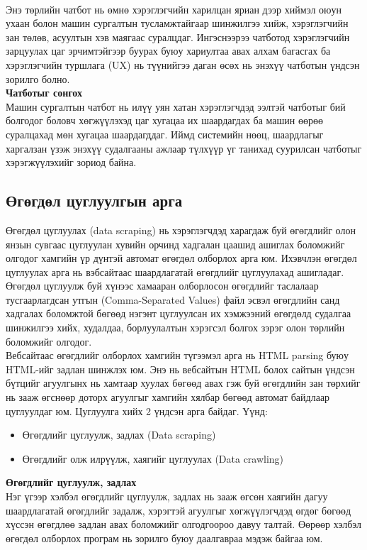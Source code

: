 \\Энэ төрлийн чатбот нь өмнө хэрэглэгчийн харилцан яриан дээр хиймэл оюун ухаан болон машин сургалтын тусламжтайгаар шинжилгээ хийж, хэрэглэгчийн зан төлөв, асуултын хэв маягаас суралцдаг. Ингэснээрээ чатботод хэрэглэгчийн зарцуулах цаг эрчимтэйгээр буурах буюу хариултаа авах алхам багасгах ба хэрэглэгчийн туршлага (UX) нь түүнийгээ даган өсөх нь энэхүү чатботын үндсэн зорилго болно. 
\\
\textbf{Чатботыг сонгох}
\\Машин сургалтын чатбот нь илүү уян хатан хэрэглэгчдэд ээлтэй чатботыг бий болгодог боловч хөгжүүлэхэд цаг хугацаа их шаардагдах ба машин өөрөө суралцахад мөн хугацаа шаардагддаг. Иймд системийн нөөц, шаардлагыг харгалзан үзэж энэхүү судалгааны ажлаар түлхүүр үг танихад суурилсан чатботыг хэрэгжүүлэхийг зориод байна. 
\subsection{Өгөгдөл цуглуулгын арга}
Өгөгдөл цуглуулах (data scraping) нь хэрэглэгчдэд харагдаж буй өгөгдлийг олон янзын сувгаас цуглуулан хувийн орчинд хадгалан цаашид ашиглах боломжийг олгодог хамгийн үр дүнтэй автомат өгөгдөл олборлох арга юм. Ихэвчлэн өгөгдөл цуглуулах арга нь вэбсайтаас шаардлагатай өгөгдлийг цуглуулахад ашигладаг. Өгөгдөл цуглуулж буй хүнээс хамааран олборлосон өгөгдлийг таслалаар тусгаарлагдсан утгын (Comma-Separated Values) файл эсвэл өгөгдлийн санд хадгалах боломжтой бөгөөд нэгэнт цуглуулсан их хэмжээний өгөгдөлд судалгаа шинжилгээ хийх, худалдаа, борлуулалтын хэрэгсэл болгох зэрэг олон төрлийн боломжийг олгодог. 
\\ Вебсайтаас өгөгдлийг олборлох хамгийн түгээмэл арга нь HTML parsing буюу HTML-ийг задлан шинжлэх юм. Энэ нь вебсайтын HTML болох сайтын үндсэн бүтцийг агуулгынх нь хамтаар хуулах бөгөөд авах гэж буй өгөгдлийн зан төрхийг нь зааж өгснөөр доторх агуулгыг хамгийн хялбар бөгөөд автомат байдлаар цуглуулдаг юм. 
Цуглуулга хийх 2 үндсэн арга байдаг. Үүнд:
\begin{itemize}
  \item Өгөгдлийг цуглуулж, задлах (Data scraping)
  \item Өгөгдлийг олж илрүүлж, хаягийг цуглуулах (Data crawling)
\end{itemize}
\textbf{Өгөгдлийг цуглуулж, задлах}
\\Нэг үгээр хэлбэл өгөгдлийг цуглуулж, задлах нь зааж өгсөн хаягийн дагуу шаардлагатай өгөгдлийг задалж, хэрэгтэй агуулгыг хөгжүүлэгчдэд өгдөг бөгөөд хүссэн өгөгдлөө задлан авах боломжийг олгодгоороо давуу талтай. Өөрөөр хэлбэл өгөгдөл олборлох програм нь зорилго буюу даалгавраа мэдэж байгаа юм. 
